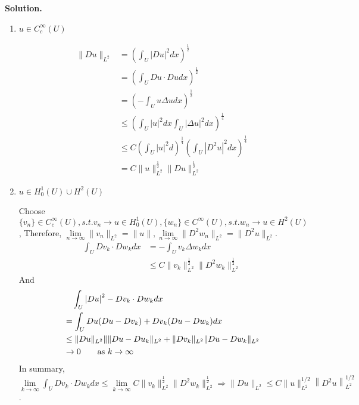 \documentclass[a4paper]{book}
\newenvironment{solution}%
{\noindent\textbf{Solution.}}%
{\qedhere}
\numberwithin{equation}{chapter}
\theoremstyle{definition}
\newlength{\length}
\begin{document}
\begin{solution}
  \begin{enumerate}
  \item $u \in C_c^\infty (U)$

    \begin{align*}
      \|Du\|_{L^2} &= (\int_U \left| Du \right|^2dx)^{\frac{1}{2}} \\
                   &= (\int_U  Du \cdot Du dx )^{\frac{1}{2}} \\
                   &= (- \int_U u \Delta u dx)^{\frac{1}{2}} \\
                   &\leq (\int_U \left| u \right|^2 dx \int_U \left| \Delta u \right|^2 dx)^{\frac{1}{4}}\\
                   &\leq C(\int_U \left| u \right|^2 d)^{\frac{1}{4}}(\int_U \left| D^2 u \right|^2 dx)^{\frac{1}{4}} \\
      &= C\|u\|_{L^2}^{\frac{1}{2}} \|Du\|_{L^2}^{\frac{1}{2}}  
    \end{align*}

  \item $u \in H_0^1(U) \cup H^2(U)$

    Choose $\{v_n\} \in C_c^\infty(U), s.t. v_n \rightarrow u \in H_0^1(U), \{w_n\} \in C^\infty(U), s.t. w_n \rightarrow u \in H^2(U)$, Therefore, $\lim\limits_{n\rightarrow \infty} \| v_n\|_{L^2} = \|u\|, \lim\limits_{n\rightarrow \infty} \|D^2 w_n \|_{L^2} = \| D^2 u\|_{L^2}$.
    \begin{align*}
      \int_U D v_k \cdot D w_k dx &= - \int_U v_k \Delta w_k dx \\
                                  &\leq C \| v_k\|_{L^2}^{\frac{1}{2}} \| D^2 w_k \|_{L^2}^{\frac{1}{2}}
    \end{align*}
    And
    \begin{align*}
      &\quad \int_U \left| Du \right|^2 - D v_k \cdot D w_k dx \\
      &= \int_U Du(Du - Dv_k) + Dv_k(Du - Dw_k) dx \\
      &\leq \|Du\|_{L^2} \| \|Du - Du_k\|_{L^2} + \|Dv_k\|_{L^2} \|Du - Dw_k\|_{L^2} \\
      &\rightarrow 0 \qquad \textmd{as } k \rightarrow \infty
    \end{align*}
    In summary, $\lim\limits_{k\rightarrow \infty} \int_U D v_k \cdot D w_k dx \leq \lim\limits_{k\rightarrow \infty} C \| v_k\|_{L^2}^{\frac{1}{2}} \| D^2 w_k \|_{L^2}^{\frac{1}{2}} \Longrightarrow  \|D u\|_{L^{2}} \leq C\|u\|_{L^{2}}^{1 / 2}\left\|D^{2} u\right\|_{L^{2}}^{1 / 2} $.
  \end{enumerate}
\end{solution}
\end{document}
